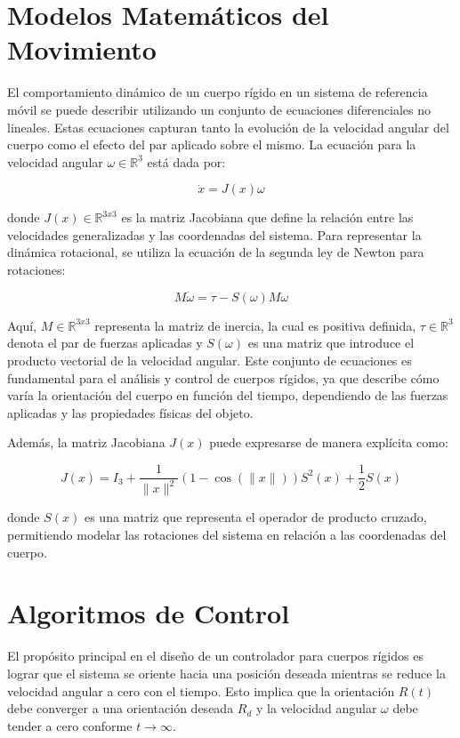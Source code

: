 \documentclass[conference]{IEEEtran}
\begin{document}
\section{Modelos Matemáticos del Movimiento}

El comportamiento dinámico de un cuerpo rígido en un sistema de referencia móvil se puede describir utilizando un conjunto de ecuaciones diferenciales no lineales. Estas ecuaciones capturan tanto la evolución de la velocidad angular del cuerpo como el efecto del par aplicado sobre el mismo. La ecuación para la velocidad angular \( \omega \in \mathbb{R}^3 \) está dada por:

\[
	\dot{x} = J(x)\omega
\]

donde \( J(x) \in \mathbb{R}^{3x3} \) es la matriz Jacobiana que define la relación entre las velocidades generalizadas y las coordenadas del sistema. Para representar la dinámica rotacional, se utiliza la ecuación de la segunda ley de Newton para rotaciones:

\[
	M \dot{\omega} = \tau - S(\omega)M\omega
\]

Aquí, \( M \in \mathbb{R}^{3x3} \) representa la matriz de inercia, la cual es positiva definida, \( \tau \in \mathbb{R}^3 \) denota el par de fuerzas aplicadas y \( S(\omega) \) es una matriz que introduce el producto vectorial de la velocidad angular. Este conjunto de ecuaciones es fundamental para el análisis y control de cuerpos rígidos, ya que describe cómo varía la orientación del cuerpo en función del tiempo, dependiendo de las fuerzas aplicadas y las propiedades físicas del objeto.

Además, la matriz Jacobiana \( J(x) \) puede expresarse de manera explícita como:

\[
	J(x) = I_3 + \frac{1}{\|x\|^2} \left( 1 - \cos(\|x\|) \right) S^2(x) + \frac{1}{2} S(x)
\]

donde \( S(x) \) es una matriz que representa el operador de producto cruzado, permitiendo modelar las rotaciones del sistema en relación a las coordenadas del cuerpo.

\section{Algoritmos de Control}

El propósito principal en el diseño de un controlador para cuerpos rígidos es lograr que el sistema se oriente hacia una posición deseada mientras se reduce la velocidad angular a cero con el tiempo. Esto implica que la orientación \( R(t) \) debe converger a una orientación deseada \( R_d \) y la velocidad angular \( \omega \) debe tender a cero conforme \( t \to \infty \).
\end{document}
